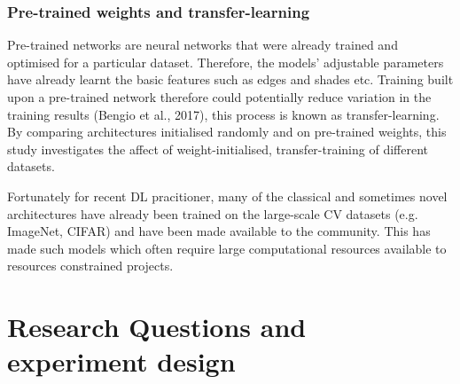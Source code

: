 \documentclass[11pt, a4paper, twoside]{report}
\begin{document}
\begin{table}[H]
  \centering
  \label{table:data_count)}
  \caption{Resulted image and label pair for each dataset input configuration}
\end{table}

\subsubsection{Pre-trained weights and transfer-learning}\label{pretrained_weights}

Pre-trained networks are neural networks that were already trained and optimised for a particular dataset. Therefore, the models' adjustable parameters have already learnt the basic features such as edges and shades etc. Training built upon a pre-trained network therefore could potentially reduce variation in the training results (Bengio et al., 2017), this process is known as transfer-learning. By comparing architectures initialised randomly and on pre-trained weights, this study investigates the affect of weight-initialised, transfer-training of different datasets.\\\par

Fortunately for recent DL pracitioner, many of the classical and sometimes novel architectures have already been trained on the large-scale CV datasets (e.g. ImageNet, CIFAR) and have been made available to the community. This has made such models which often require large computational resources available to resources constrained projects.\\\par

\section{Research Questions and experiment design}\label{RQ}
\end{document}
